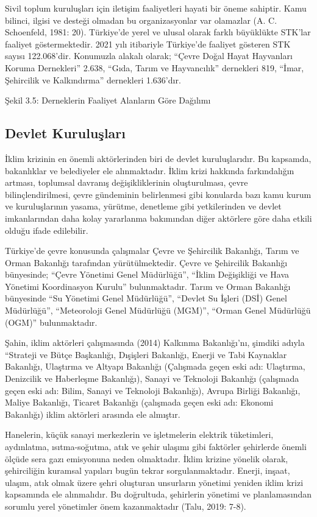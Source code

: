 \documentclass[
]{book}
\begin{document}
Sivil toplum kuruluşları için iletişim faaliyetleri hayati bir öneme sahiptir. Kamu bilinci, ilgisi ve desteği olmadan bu organizasyonlar var olamazlar (A. C. Schoenfeld, 1981: 20). Türkiye'de yerel ve ulusal olarak farklı büyüklükte STK'lar faaliyet göstermektedir. 2021 yılı itibariyle Türkiye'de faaliyet gösteren STK sayısı 122.068'dir. Konumuzla alakalı olarak; ``Çevre Doğal Hayat Hayvanları Koruma Dernekleri'' 2.638, ``Gıda, Tarım ve Hayvancılık'' dernekleri 819, ``İmar, Şehircilik ve Kalkındırma'' dernekleri 1.636'dır.

Şekil 3.5: Derneklerin Faaliyet Alanların Göre Dağılımı

\hypertarget{devlet-kuruluux15flarux131}{%
\subsection{Devlet Kuruluşları}\label{devlet-kuruluux15flarux131}}

İklim krizinin en önemli aktörlerinden biri de devlet kuruluşlarıdır. Bu kapsamda, bakanlıklar ve belediyeler ele alınmaktadır. İklim krizi hakkında farkındalığın artması, toplumsal davranış değişikliklerinin oluşturulması, çevre bilinçlendirilmesi, çevre gündeminin belirlenmesi gibi konularda bazı kamu kurum ve kuruluşlarının yasama, yürütme, denetleme gibi yetkilerinden ve devlet imkanlarından daha kolay yararlanma bakımından diğer aktörlere göre daha etkili olduğu ifade edilebilir.

Türkiye'de çevre konusunda çalışmalar Çevre ve Şehircilik Bakanlığı, Tarım ve Orman Bakanlığı tarafından yürütülmektedir. Çevre ve Şehircilik Bakanlığı bünyesinde; ``Çevre Yönetimi Genel Müdürlüğü'', ``İklim Değişikliği ve Hava Yönetimi Koordinasyon Kurulu'' bulunmaktadır. Tarım ve Orman Bakanlığı bünyesinde ``Su Yönetimi Genel Müdürlüğü'', ``Devlet Su İşleri (DSİ) Genel Müdürlüğü'', ``Meteoroloji Genel Müdürlüğü (MGM)'', ``Orman Genel Müdürlüğü (OGM)'' bulunmaktadır.

Şahin, iklim aktörleri çalışmasında (2014) Kalkınma Bakanlığı'nı, şimdiki adıyla ``Strateji ve Bütçe Başkanlığı, Dışişleri Bakanlığı, Enerji ve Tabi Kaynaklar Bakanlığı, Ulaştırma ve Altyapı Bakanlığı (Çalışmada geçen eski adı: Ulaştırma, Denizcilik ve Haberleşme Bakanlığı), Sanayi ve Teknoloji Bakanlığı (çalışmada geçen eski adı: Bilim, Sanayi ve Teknoloji Bakanlığı), Avrupa Birliği Bakanlığı, Maliye Bakanlığı, Ticaret Bakanlığı (çalışmada geçen eski adı: Ekonomi Bakanlığı) iklim aktörleri arasında ele almıştır.

Hanelerin, küçük sanayi merkezlerin ve işletmelerin elektrik tüketimleri, aydınlatma, ısıtma-soğutma, atık ve şehir ulaşımı gibi faktörler şehirlerde önemli ölçüde sera gazı emisyonuna neden olmaktadır. İklim krizine yönelik olarak, şehirciliğin kuramsal yapıları bugün tekrar sorgulanmaktadır. Enerji, inşaat, ulaşım, atık olmak üzere şehri oluşturan unsurların yönetimi yeniden iklim krizi kapsamında ele alınmalıdır. Bu doğrultuda, şehirlerin yönetimi ve planlamasından sorumlu yerel yönetimler önem kazanmaktadır (Talu, 2019: 7-8).
\end{document}
